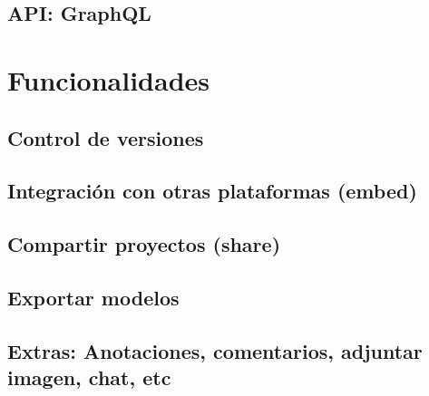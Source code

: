 \subsection{API: GraphQL}


\section{Funcionalidades}

\subsection{Control de versiones}

\subsection{Integración con otras plataformas (embed)}

\subsection{Compartir proyectos (share)}

\subsection{Exportar modelos}

\subsection{Extras: Anotaciones, comentarios, adjuntar imagen, chat, etc}
